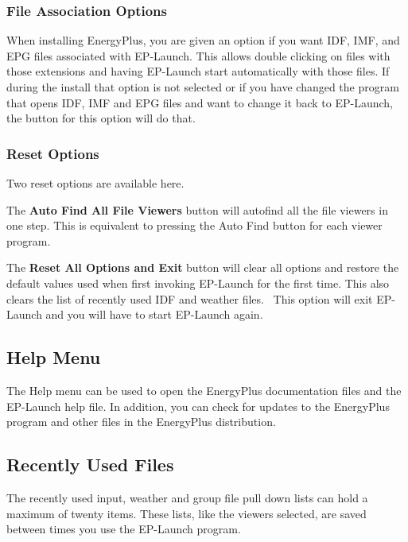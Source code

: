 \subsubsection{File Association Options}\label{file-association-options}

When installing EnergyPlus, you are given an option if you want IDF, IMF, and EPG files associated with EP-Launch. This allows double clicking on files with those extensions and having EP-Launch start automatically with those files. If during the install that option is not selected or if you have changed the program that opens IDF, IMF and EPG files and want to change it back to EP-Launch, the button for this option will do that.

\subsubsection{Reset Options}\label{reset-options}

Two reset options are available here.

The \textbf{Auto Find All File Viewers} button will autofind all the file viewers in one step. This is equivalent to pressing the Auto Find button for each viewer program.

The \textbf{Reset All Options and Exit} button will clear all options and restore the default values used when first invoking EP-Launch for the first time. This also clears the list of recently used IDF and weather files.~ This option will exit EP-Launch and you will have to start EP-Launch again.

\subsection{Help Menu}\label{help-menu}

The Help menu can be used to open the EnergyPlus documentation files and the EP-Launch help file. In addition, you can check for updates to the EnergyPlus program and other files in the EnergyPlus distribution.

\subsection{Recently Used Files}\label{recently-used-files}

The recently used input, weather and group file pull down lists can hold a maximum of twenty items. These lists, like the viewers selected, are saved between times you use the EP-Launch program.

